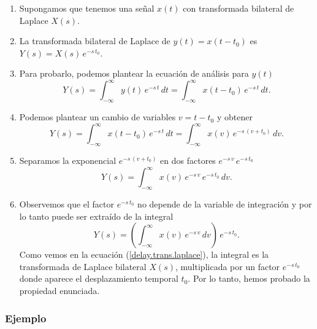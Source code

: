 \begin{enumerate}
\item Supongamos que tenemos una se\~{n}al $x(t)$ con transformada bilateral de Laplace $X(s)$. 

\item La transformada bilateral de Laplace de $y(t) = x(t - t_{0})$ es $Y(s) = X(s) \, e^{-s \, t_{0}}$.

\item Para probarlo, podemos plantear la ecuaci\'{o}n de an\'{a}lisis para $y(t)$
\begin{equation}
  Y(s) = \int_{-\infty}^{\infty} y(t) \, e^{-s \, t} \, dt = \int_{-\infty}^{\infty} x(t - t_{0}) \, e^{-s \, t} \, dt.
\end{equation}

\item Podemos plantear un cambio de variables $v = t - t_{0}$ y obtener
\begin{equation}
  Y(s) = \int_{-\infty}^{\infty} x(t - t_{0}) \, e^{-s \, t} \, dt = \int_{-\infty}^{\infty} x(v) \, e^{-s \, (v + t_{0})} \, dv.
\end{equation}

\item Separamos la exponencial $e^{-s \, (v + t_{0})}$ en dos factores $e^{-s \, v} \, e^{-s \, t_{0}}$
\begin{equation}
  Y(s) = \int_{-\infty}^{\infty} x(v) \, e^{-s \, v} \, e^{-s \, t_{0}}\, dv.
\end{equation}

\item Observemos que el factor $e^{-s \, t_{0}}$ no depende de la variable de integraci\'{o}n y por lo tanto puede ser extra\'{i}do de la integral
\begin{equation}
  Y(s) = \left( \int_{-\infty}^{\infty} x(v) \, e^{-s \, v} \, dv \right) \, e^{-s \, t_{0}}. \label{delay.trans.laplace}
\end{equation}
Como vemos en la ecuaci\'{o}n (\ref{delay.trans.laplace}), la integral  es la transformada de Laplace bilateral $X(s)$, multiplicada por un factor $e^{-s \, t_{0}}$ donde aparece el desplazamiento temporal $t_{0}$. Por lo tanto, hemos probado la propiedad enunciada.

\end{enumerate}

\subsubsection{Ejemplo}

